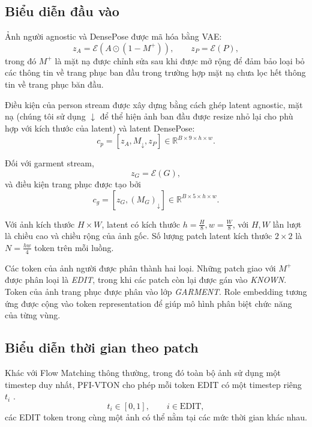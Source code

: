 \documentclass[11pt,a4paper]{article}
\newcommand{\Enc}{\mathcal{E}}
\begin{document}
\subsection{Biểu diễn đầu vào}

Ảnh người agnostic và DensePose được mã hóa bằng VAE:
\begin{equation}
z_A=\Enc(A\odot(1-M^+)),\qquad z_P=\Enc(P),
\end{equation}
trong đó \(M^+\) là mặt nạ được chỉnh sửa sau khi được mở rộng để đảm bảo loại bỏ các thông tin về trang phục ban đầu trong trường hợp mặt nạ chưa lọc hết thông tin về trang phục băn đầu.

Điều kiện của person stream được xây dựng bằng cách ghép latent agnostic, mặt nạ (chúng tôi sử dụng ${\downarrow}$ để thể hiện ảnh ban đầu được resize nhỏ lại cho phù hợp với kích thước của latent) và latent DensePose:
\begin{equation}
c_p=[z_A,M_{\downarrow},z_P] \in \mathbb{R}^{B\times9\times h\times w}. \label{eq:person_condition}
\end{equation}

Đối với garment stream,
\begin{equation}
z_G=\Enc(G),
\end{equation}
và điều kiện trang phục được tạo bởi
\begin{equation}
c_g=[z_G,(M_G)_{\downarrow}] \in \mathbb{R}^{B\times5\times h\times w}. \label{eq:garment_condition}
\end{equation}

Với ảnh kích thước \(H\times W\), latent có kích thước $ h=\frac{H}{8}, w=\frac{W}{8} $, với $H, W$ lần lượt là chiều cao và chiều rộng của ảnh gốc. Số lượng patch latent kích thước \(2\times2\) là $ N=\frac{hw}{4} $ token trên mỗi luồng.

Các token của ảnh người được phân thành hai loại. Những patch giao với $M^+$ được phân loại là \textit{EDIT}, trong khi các patch còn lại được gán vào \textit{KNOWN}. Token của ảnh trang phục được phân vào lớp \textit{GARMENT}. Role embedding tương ứng được cộng vào token representation để giúp mô hình phân biệt chức năng của từng vùng.

\subsection{Biểu diễn thời gian theo patch}

Khác với Flow Matching thông thường, trong đó toàn bộ ảnh sử dụng một timestep duy nhất, PFI-VTON cho phép mỗi token EDIT có một timestep riêng \(t_i\) \cite{pf}.
\begin{equation}
t_i\in[0,1], \qquad i\in\mathrm{EDIT},
\end{equation}
các EDIT token trong cùng một ảnh có thể nằm tại các mức thời gian khác nhau.
\end{document}
